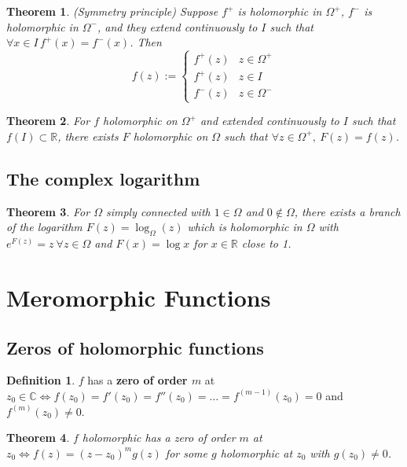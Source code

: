 \documentclass[12pt]{article}
\newtheorem{thm}{Theorem}[section]
\theoremstyle{definition}
\newtheorem{defn}{Definition}[section]
\newcommand{\C}{\mathbb{C}}
\newcommand{\R}{\mathbb{R}}
\begin{document}
\begin{thm}
  (Symmetry principle)
  Suppose $f^+$ is holomorphic in $\Omega^+$, $f^-$ is holomorphic in $\Omega^-$, and they extend continuously to $I$ such that $\forall x \in I\, f^+(x) = f^-(x)$.
  Then
  $$f(z) := \begin{cases}
    f^+(z) & z \in \Omega^+ \\
    f^+(z) & z \in I \\
    f^-(z) & z \in \Omega^- 
  \end{cases}$$
\end{thm}

\begin{thm}
  For $f$ holomorphic on $\Omega^+$ and extended continuously to $I$ such that $f(I) \subset \R$, there exists $F$ holomorphic on $\Omega$ such that $\forall z \in \Omega^+,\ F(z) = f(z)$.
\end{thm}

\subsection{The complex logarithm}

\begin{thm}
  For $\Omega$ simply connected with $1 \in \Omega$ and $0 \notin \Omega$, there exists a branch of the logarithm $F(z) = \log_{\Omega}(z)$ which is holomorphic in $\Omega$ with $e^{F(z)} = z\ \forall z \in \Omega$ and $F(x) = \log{x}$ for $x \in \R$ close to 1.
\end{thm}

\section{Meromorphic Functions}

\subsection{Zeros of holomorphic functions}

\begin{defn}
  $f$ has a \textbf{zero of order $m$} at $z_0 \in \C \iff f(z_0) = f'(z_0) = f''(z_0) = \ldots = f^{(m - 1)}(z_0) = 0$ and $f^{(m)}(z_0) \neq 0$.
\end{defn}

\begin{thm}
  $f$ holomorphic has a zero of order $m$ at $z_0 \iff f(z) = (z - z_0)^mg(z)$ for some $g$ holomorphic at $z_0$ with $g(z_0) \neq 0$.
\end{thm}
\end{document}
